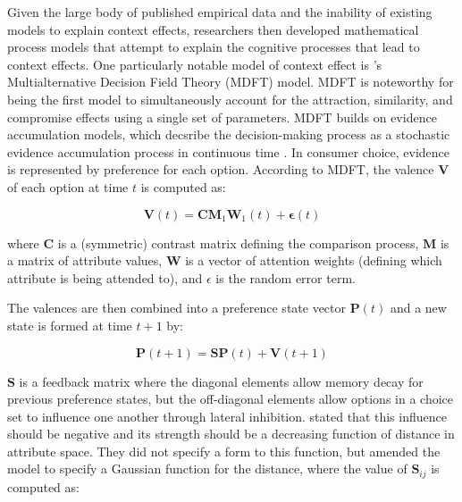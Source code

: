 Given the large body of published empirical data and the inability of existing models to explain context effects, researchers then developed mathematical process models that attempt to explain the cognitive processes that lead to context effects. One particularly notable model of context effect is \textcite{roeMultialternativeDecisionField2001a}'s Multialternative Decision Field Theory (MDFT) model. MDFT is noteworthy for being the first model to simultaneously account for the attraction, similarity, and compromise effects using a single set of parameters. MDFT builds on evidence accumulation models, which decsribe the decision-making process as a stochastic evidence accumulation process in continuous time \parencite{ratcliff1978theory}. In consumer choice, evidence is represented by preference for each option. According to MDFT, the valence $\boldsymbol{V}$ of each option at time $t$ is computed as:


\begin{equation}
    \boldsymbol{V}(t)=\boldsymbol{C}\bm{M}_1\boldsymbol{W}_1(t) + \boldsymbol{\epsilon}(t)
    \label{eqn:mdft}
\end{equation}

where $\boldsymbol{C}$ is a (symmetric) contrast matrix defining the comparison process, $\boldsymbol{M}$ is a matrix of attribute values, $\boldsymbol{W}$ is a vector of attention weights (defining which attribute is being attended to), and $\epsilon$ is the random error term. 

The valences are then combined into a preference state vector $\boldsymbol{P}(t)$ and a new state is formed at time $t+1$ by:

\begin{equation}
    \boldsymbol{P}(t+1)=\boldsymbol{SP}(t)+\boldsymbol{V}(t+1)
    \label{eqn:mdft1}
\end{equation}

$\boldsymbol{S}$ is a feedback matrix where the diagonal elements allow memory decay for previous preference states, but the off-diagonal elements allow options in a choice set to influence one another through lateral inhibition. \textcite{roeMultialternativeDecisionField2001a} stated that this influence should be negative and its strength should be a decreasing function of distance in attribute space. They did not specify a form to this function, but \textcite{hotalingTheoreticalDevelopmentsDecision2010} amended the model to specify a Gaussian function for the distance, where the value of $\boldsymbol{S}_{ij}$ is computed as:

